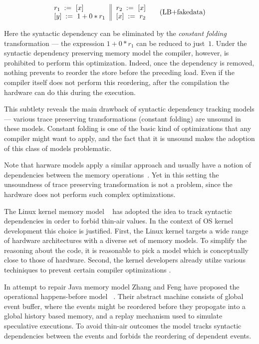 \begin{equation*}
\inarrII{
  \readInst{}{r_1}{x}           \\
  \writeInst{}{y}{1 + 0 * r_1}  \\
}{
  \readInst{}{r_2}{x}      \\
  \writeInst{}{x}{r_2}     \\
}
\tag{LB+fakedata}\label{ex:lb+fakedata}
\end{equation*}

Here the syntactic dependency can be eliminated 
by the \emph{constant folding} transformation --- 
the expression $1 + 0 * r_1$ can be reduced to just~$1$.
Under the syntactic dependency preserving memory model 
the compiler, however, is prohibited to perform this optimization. 
Indeed, once the dependency is removed, nothing prevents 
to reorder the store before the preceding load. 
Even if the compiler itself does not perform this reordering,
after the compilation the hardware can do this during the execution.   

This subtlety reveals the main drawback of 
syntactic dependency tracking models --- 
various trace preserving transformations
(\eg constant folding) are unsound in these models. 
Constant folding is one of the basic kind of optimizations that 
any compiler might want to apply, 
and the fact that it is unsound  
makes the adoption of this class of models problematic.

Note that harware models apply a similar approach 
and usually have a notion of dependencies between 
the memory operations~\cite{Sarkar-al:PLDI11, Alglave-al:TOPLAS14, Pulte-al:POPL18}.
Yet in this setting the unsoundness of 
trace preserving transformation is not a problem,
since the hardware does not perform such complex optimizations.

The Linux kernel memory model \LKMM~\cite{Alglave-al:ASPLOS18} has adopted 
the idea to track syntactic dependencies in order to 
forbid thin-air values. In the context of OS kernel development 
this choice is justified. First, the Linux kernel targets 
a wide range of hardware architectures with a diverse
set of memory models. To simplify the reasoning about the code, 
it is reasonable to pick a model which is conceptually close
to those of hardware. Second, the kernel developers 
already utilze various techiniques to prevent 
certain compiler optimizations%
\cite{Alglave-al:ASPLOS18, LK-MemBarriers, LK-RCU-Deref}.

In attempt to repair Java memory model Zhang and Feng have proposed the 
operational happens-before model \OHMM~\cite{Zhang-Feng:FCS16}.
Their abstract machine consists of global event buffer,
where the events might be reordered before they propogate into  
a global history based memory, and a replay mechanism 
used to simulate speculative executions. 
To avoid thin-air outcomes the model tracks syntactic dependencies 
between the events and forbids the reordering of dependent events. 


